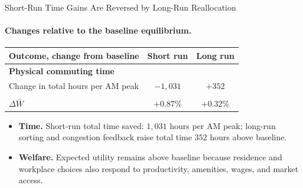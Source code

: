 \documentclass[11pt,aspectratio=169]{beamer}
\newcommand{\good}[1]{\textcolor{blue!70!black}{#1}}
\newcommand{\bad}[1]{\textcolor{red!70!black}{#1}}
\newcommand{\app}[1]{\allowbreak\hspace{0.25em}\hyperlink{#1}{\beamergotobutton{details}}}
\begin{document}
\begin{frame}[label=result2]{Short-Run Time Gains Are Reversed by Long-Run Reallocation}
\framesubtitle{Changes relative to the baseline equilibrium.}
\centering
\vspace{0.25em}
\scriptsize
\renewcommand{\arraystretch}{1.22}
\setlength{\tabcolsep}{14pt}
\begin{tabular}{lcc}
\toprule
Outcome, change from baseline & Short run & Long run \\
\midrule
\multicolumn{3}{l}{\textbf{Physical commuting time}} \\
Change in total hours per AM peak & \good{$-1{,}031$} & \bad{$+352$} \\
\addlinespace[0.25em]
\multicolumn{3}{l}{\textbf{Expected-utility welfare}} \\
$\Delta\bar W$ & \good{$+0.87\%$} & \good{$+0.32\%$} \\
\bottomrule
\end{tabular}

\vspace{0.85em}
\begin{itemize}\footnotesize\setlength\itemsep{0.35em}
  \item \textbf{Time.} Short-run total time saved: $1{,}031$ hours per AM peak; long-run sorting and congestion feedback raise total time $352$ hours above baseline. \app{appphysicaltime}
  \item \textbf{Welfare.} Expected utility remains above baseline because residence and workplace choices also respond to productivity, amenities, wages, and market access.
\end{itemize}
\end{frame}
\end{document}
